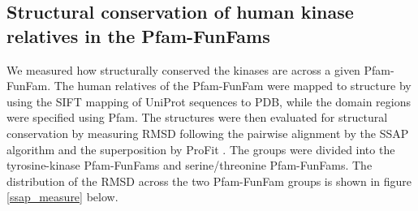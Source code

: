 \documentclass[a4paper, 11pt]{report}
\begin{document}
\subsection{Structural conservation of human kinase relatives in the Pfam-FunFams}
We measured how structurally conserved the kinases  are across a given Pfam-FunFam. The human relatives of the Pfam-FunFam were mapped to structure by using the SIFT mapping of  UniProt sequences to PDB, while the domain regions were specified using Pfam. The structures were then evaluated for structural conservation by measuring RMSD following the pairwise alignment by the SSAP algorithm \cite{orengo199636} and the superposition by ProFit \cite{MartinProFit2009}. The groups were divided into the tyrosine-kinase Pfam-FunFams and serine/threonine Pfam-FunFams. The distribution of the RMSD across the two Pfam-FunFam groups is shown in figure \ref{ssap_measure} below.
\end{document}
